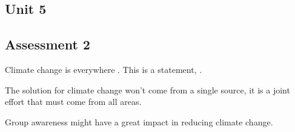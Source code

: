 \documentclass[11pt]{report}
\begin{document}
\begin{mainf} %
\chapter{Unit 5}
\section*{Assessment 2}
    Climate change is everywhere \cite{behrens_lemuridae_2016}.
    This is a statement, \cite{lake_white_1979}.
    
    The solution for climate change won't come from a single source, it is a joint effort that must come from all areas.

    Group awareness might have a great impact in reducing climate change.


\end{mainf}


\begin{bibliof}

\end{bibliof}
\end{document}
